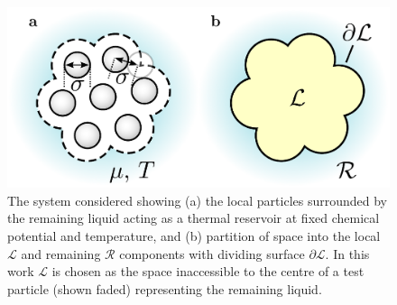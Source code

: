 \documentclass[11pt]{report}
\begin{document}
\begin{figure}\label{fig:system}
  \includegraphics[width=\linewidth]{droplet-morph}
  \caption{
    The system considered showing
    (a) the local particles surrounded by the remaining liquid acting as a thermal reservoir at fixed chemical potential and temperature, and
    (b) partition of space into the local $\mathcal{L}$ and remaining $\mathcal{R}$ components with dividing surface $\partial\mathcal{L}$.
    In this work $\mathcal{L}$ is chosen as the space inaccessible to the centre of a test particle (shown faded) representing the remaining liquid.
  }
\end{figure}
\end{document}
